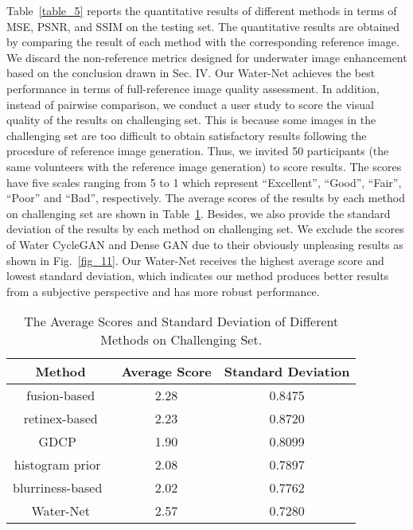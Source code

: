 \documentclass[journal]{IEEEtran}
\begin{document}
Table~\ref{table_5} reports the quantitative results of different methods in terms of MSE, PSNR, and SSIM on the testing set. The quantitative results are obtained by comparing the result of each method with the corresponding reference image.  We discard the non-reference metrics designed for underwater image enhancement based on the conclusion drawn in Sec. IV. Our Water-Net achieves the best performance in terms of full-reference image quality assessment.
In addition, instead of pairwise comparison, we conduct a user study to score the visual quality of the results on challenging set. This is because some images in the challenging set are too difficult to obtain satisfactory results following the procedure of reference image generation. Thus, we invited 50 participants (the same volunteers with the reference image generation) to score results.  The scores have five scales ranging from 5 to 1 which represent ``Excellent'', ``Good'', ``Fair'', ``Poor'' and ``Bad'', respectively. The average scores of the results by each method on challenging set are shown in Table~\ref{table_6}. Besides, we also provide the standard deviation of the results by each method on challenging set. We exclude the scores of Water CycleGAN \cite{Emerging} and Dense GAN \cite{Guo2019} due to their obviously unpleasing results as shown in Fig.~\ref{fig_11}. Our Water-Net receives the highest average score and lowest standard deviation, which indicates our method produces better results from a subjective perspective and has more robust performance.

\begin{table}[htbp]
\caption{The Average Scores and Standard Deviation of Different Methods on Challenging Set.}
 \centering
\begin{tabular}{c|c|c}
  \hline
  \textbf{Method} & \textbf{Average Score}  & \textbf{Standard Deviation} \\
  \hline
  fusion-based \cite{Ancuti2012} & \textcolor[rgb]{0.00,0.07,1.00}{2.28} & 0.8475\\
  retinex-based \cite{Fu2014} & 2.23 & 0.8720 \\
  GDCP~\cite{Peng2018} & 1.90 & 0.8099\\
  histogram prior~\cite{Li2016} & 2.08 &  0.7897\\
  blurriness-based~\cite{Peng2017} & 2.02 &\textcolor[rgb]{0.00,0.07,1.00}{0.7762}\\
  Water-Net &  \textcolor[rgb]{1.00,0.00,0.00}{2.57} & \textcolor[rgb]{1.00,0.00,0.00}{0.7280} \\
  \hline
\end{tabular}
\vspace{\baselineskip}
\label{table_6}
\end{table}
\end{document}
